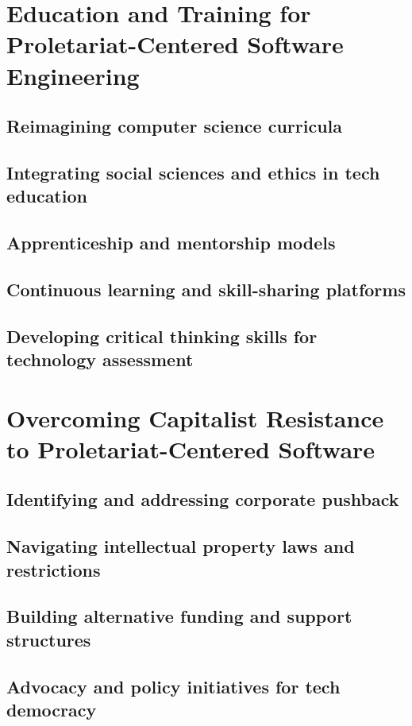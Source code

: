 \newpage

\section{Education and Training for Proletariat-Centered Software Engineering}
\subsection{Reimagining computer science curricula}
\subsection{Integrating social sciences and ethics in tech education}
\subsection{Apprenticeship and mentorship models}
\subsection{Continuous learning and skill-sharing platforms}
\subsection{Developing critical thinking skills for technology assessment}

\newpage

\section{Overcoming Capitalist Resistance to Proletariat-Centered Software}
\subsection{Identifying and addressing corporate pushback}
\subsection{Navigating intellectual property laws and restrictions}
\subsection{Building alternative funding and support structures}
\subsection{Advocacy and policy initiatives for tech democracy}


